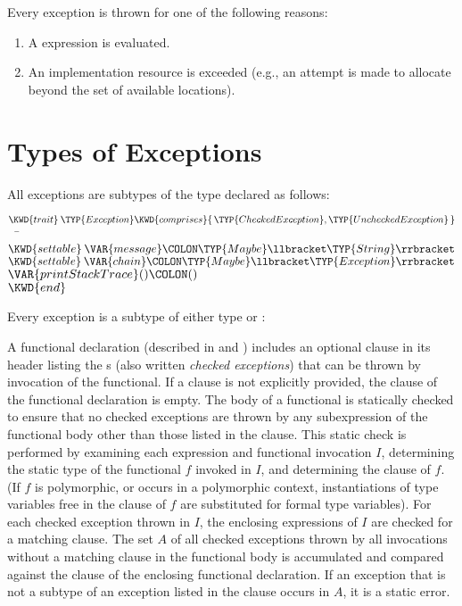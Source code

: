 Every exception is thrown for one of the following reasons:
\begin{enumerate}
\item A  expression is evaluated.
\item An implementation resource is exceeded (e.g., an attempt is made to
  allocate beyond the set of available locations).
\end{enumerate}


\section{Types of Exceptions}

All exceptions are subtypes of the type  declared as follows:
\begin{Fortress}
\(\KWD{trait}\:\TYP{Exception} \KWD{comprises} \{\,\TYP{CheckedException}, \TYP{UncheckedException}\,\}\)\\
{\tt~~}\pushtabs\=\+\(  \KWD{settable}\:\VAR{message}\COLON \TYP{Maybe}\llbracket\TYP{String}\rrbracket\)\\
\(  \KWD{settable}\:\VAR{chain}\COLON \TYP{Maybe}\llbracket\TYP{Exception}\rrbracket\)\\
\(  \VAR{printStackTrace}()\COLON ()\)\-\\\poptabs
\(\KWD{end}\)
\end{Fortress}
Every exception is a subtype of either type
 or :


A functional declaration (described in 
and )
includes an optional  clause in its
header listing the s (also written
\emph{checked exceptions})
that can be thrown by invocation of the functional.  If a 
clause is not explicitly provided, the  clause of the
functional declaration is empty.  The body of a
functional is statically checked to ensure that no checked exceptions
are thrown by any subexpression of the functional
body other than those listed in the  clause.
This static check is performed by examining each  expression and
functional invocation $I$, determining the static
type of the functional $f$ invoked in $I$, and determining the
 clause of
$f$. (If $f$ is polymorphic, or occurs in a polymorphic context,
instantiations of type variables free in the  clause
of $f$  are substituted for formal type variables).
For each checked exception thrown in $I$, the enclosing expressions of
$I$ are checked for a matching  clause.
The set $A$ of all
checked exceptions thrown by all invocations without a matching
 clause in the functional body is accumulated and compared
against the  clause of the enclosing functional declaration. If an
exception that is not a subtype of an exception
listed in the  clause occurs in $A$, it is a static error.

